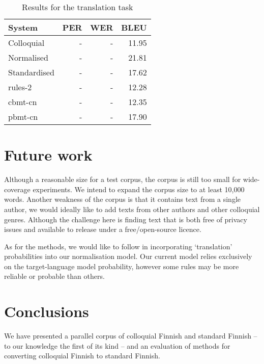 \documentclass[11pt]{article}
\begin{document}
\begin{table}
  \centering
  \begin{tabular}{|l|r|r|r|}
     \hline
    \textbf{System} & \textbf{PER} & \textbf{WER} & \textbf{BLEU} \\
     \hline
     Colloquial & - & - & 11.95 \\
     Normalised & - & - & 21.81 \\
     Standardised & - & - & 17.62 \\
     \hline
     rules-2 & - & - & 12.28 \\
     cbmt-cn & - & - & 12.35 \\
     pbmt-cn & - & - & 17.90 \\
     \hline
  \end{tabular}
  \caption{Results for the translation task}
  \label{table:results-trad}
\end{table}

\section{Future work}

% 

Although a reasonable size for a test corpus, the corpus is still too small for 
wide-coverage experiments. We intend to expand the corpus size to at least 10,000
words. Another weakness of the corpus is that it contains text from a single author,
we would ideally like to add texts from other authors and other colloquial genres. Although
the challenge here is finding text that is both free of privacy issues and available
to release under a free/open-source licence.

As for the methods, we would like to follow  in incorporating
`translation' probabilities into our normalisation model. Our current model relies 
exclusively on the target-language model probability, however some rules may be more
reliable or probable than others.

\section{Conclusions}

We have presented a parallel corpus of colloquial Finnish and standard Finnish --
to our knowledge the first of its kind -- and an evaluation of methods for 
converting colloquial Finnish to standard Finnish. 
\end{document}
